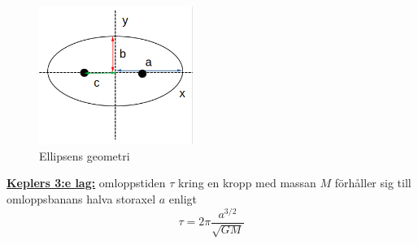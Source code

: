 \documentclass{article}
\newenvironment{ankiflashcard}[1]{}{}
\begin{document}
\begin{paracol}{2}
\begin{ankiflashcard}{Rita upp de olika sträckorna i en ellips.}
\begin{figure}[H]
    \centering
    \includegraphics[width=5cm]{ellipsens_geometri.png}
    \caption{Ellipsens geometri}
\end{figure}
\end{ankiflashcard}

\begin{ankiflashcard}{Formulera Keplers 3:e lag}
\underline{\textbf{Keplers 3:e lag:}} omloppstiden $\tau$ kring en kropp med massan $M$ förhåller sig till omloppsbanans halva storaxel $a$ enligt
$$
\tau = 2\pi \frac{a^{3/2}}{\sqrt{GM}}
$$
\end{ankiflashcard}

\end{paracol}
\end{document}
